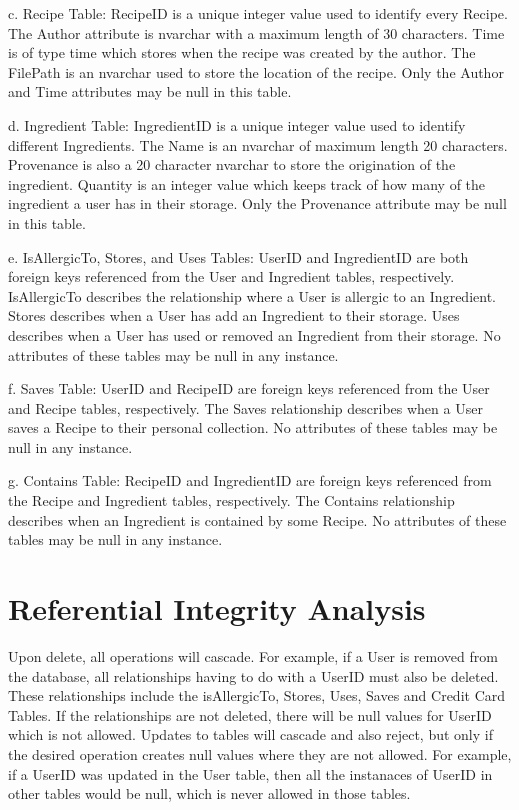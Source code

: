 \documentclass{article}
\begin{document}
c.	Recipe Table: RecipeID is a unique integer value used to identify every Recipe. The Author attribute is nvarchar with a maximum length of 30 characters. Time is of type time which stores when the recipe was created by the author. The FilePath is an nvarchar used to store the location of the recipe. Only the Author and Time attributes may be null in this table.

d.	Ingredient Table: IngredientID is a unique integer value used to identify different Ingredients. The Name is an nvarchar of maximum length 20 characters. Provenance is also a 20 character nvarchar to store the origination of the ingredient. Quantity is an integer value which keeps track of how many of the ingredient a user has in their storage. Only the Provenance attribute may be null in this table.

e.	IsAllergicTo, Stores, and Uses Tables: UserID and IngredientID are both foreign keys referenced from the User and Ingredient tables, respectively. IsAllergicTo describes the relationship where a User is allergic to an Ingredient. Stores describes when a User has add an Ingredient to their storage. Uses describes when a User has used or removed an Ingredient from their storage. No attributes of these tables may be null in any instance.

f.	Saves Table: UserID and RecipeID are foreign keys referenced from the User and Recipe tables, respectively. The Saves relationship describes when a User saves a Recipe to their personal collection. No attributes of these tables may be null in any instance.
 
g.	Contains Table: RecipeID and IngredientID are foreign keys referenced from the Recipe and Ingredient tables, respectively. The Contains relationship describes when an Ingredient is contained by some Recipe. No attributes of these tables may be null in any instance.

\section{Referential Integrity Analysis}
	Upon delete, all operations will cascade. For example, if a User is removed from the database, all relationships having to do with a UserID must also be deleted. These relationships include the isAllergicTo, Stores, Uses, Saves and Credit Card Tables. If the relationships are not deleted, there will be null values for UserID which is not allowed.
	Updates to tables will cascade and also reject, but only if the desired operation creates null values where they are not allowed. For example, if a UserID was updated in the User table, then all the instanaces of UserID in other tables would be null, which is never allowed in those tables.
\end{document}
